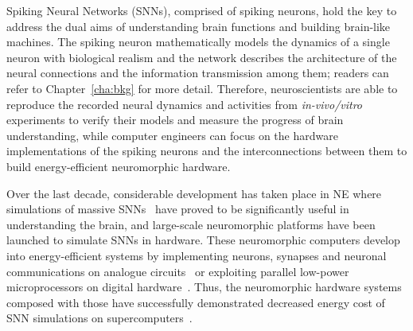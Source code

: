 Spiking Neural Networks (SNNs), comprised of spiking neurons, hold the key to address the dual aims of understanding brain functions and building brain-like machines.
The spiking neuron mathematically models the dynamics of a single neuron with biological realism and the network describes the architecture of the neural connections and the information transmission among them; readers can refer to Chapter~\ref{cha:bkg} for more detail.
Therefore, neuroscientists are able to reproduce the recorded neural dynamics and activities from \textit{in-vivo/vitro} experiments to verify their models and measure the progress of brain understanding,
while computer engineers can focus on the hardware implementations of the spiking neurons and the interconnections between them to build energy-efficient neuromorphic hardware.

Over the last decade, considerable development has taken place in NE where simulations of massive SNNs~\citep{markram2006blue,ananthanarayanan2009cat} have proved to be significantly useful in understanding the brain, and large-scale neuromorphic platforms have been launched to simulate SNNs in hardware.
These neuromorphic computers develop into energy-efficient systems by implementing neurons, synapses and neuronal communications on analogue circuits~\citep{schemmel2010wafer,benjamin2014neurogrid,yu201265k} or exploiting parallel low-power microprocessors on digital hardware~\citep{furber2014spinnaker,merolla2014million}. 
Thus, the neuromorphic hardware systems composed with those have successfully demonstrated decreased energy cost of SNN simulations on supercomputers~\citep{de2010world,sharp2012power}.

